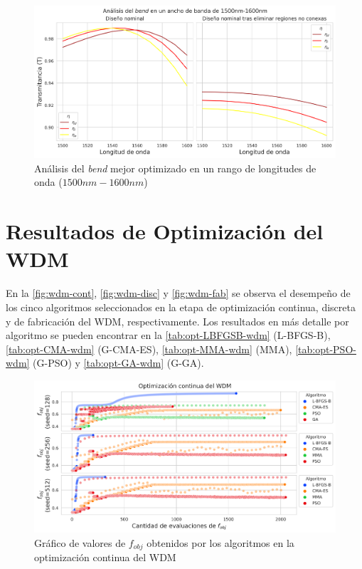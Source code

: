 \begin{figure}[ht]
  \centering
  \includegraphics[width=\textwidth]{image/results/bend/best/broadband-bend.png}
  \caption{Análisis del \emph{bend} mejor optimizado en un rango de longitudes de onda ($1500 nm-1600 nm$)}
  \label{fig:broadband-bend}
\end{figure}

\section{Resultados de Optimización del WDM}\label{sec:results-wdm}

En la \autoref{fig:wdm-cont}, \autoref{fig:wdm-disc} y \autoref{fig:wdm-fab} se observa 
el desempeño de los cinco algoritmos seleccionados en la etapa de optimización continua, discreta y
de fabricación del WDM, respectivamente.
Los resultados en más detalle por algoritmo se pueden encontrar en la
\autoref{tab:opt-LBFGSB-wdm} (L-BFGS-B),
\autoref{tab:opt-CMA-wdm} (G-CMA-ES),
\autoref{tab:opt-MMA-wdm} (MMA),
\autoref{tab:opt-PSO-wdm} (G-PSO) y
\autoref{tab:opt-GA-wdm} (G-GA).

\begin{landscape}
\begin{figure}[ht]
  \centering
  \includegraphics[scale=1.0]{image/results/wdm/wdm-opt-cont.png}
  \caption{Gráfico de valores de $f_{obj}$ obtenidos por los algoritmos en la optimización continua del WDM}
  \label{fig:wdm-cont}
\end{figure}
\end{landscape}

